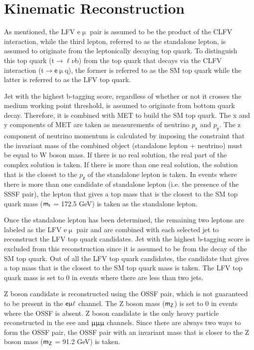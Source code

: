 \section{Kinematic Reconstruction}
\label{sec:Kin}

As mentioned, the LFV e$\upmu$ pair is assumed to be the product of the \ac{CLFV} interaction, while the third lepton, referred to as the standalone lepton, is assumed to originate from the leptonically decaying top quark. To distinguish this top quark (t$\rightarrow\ell\nu$b) from the top quark that decays via the \ac{CLFV} interaction (t$\rightarrow\textsf{e}\upmu$q), the former is referred to as the \ac{SM} top quark while the latter is referred to as the LFV top quark. 

Jet with the highest b-tagging score, regardless of whether or not it crosses the medium working point threshold, is assumed to originate from bottom quark decay. Therefore, it is combined with \ac{MET} to build the \ac{SM} top quark. The x and y components of \ac{MET} are taken as measurements of neutrino $p_{\textsf{x}}$ and $p_{\textsf{y}}$. The z component of neutrino momentum is calculated by imposing the constraint that the invariant mass of the combined object (standalone lepton + neutrino) must be equal to W boson mass. If there is no real solution, the real part of the complex solution is taken. If there is more than one real solution, the solution that is the closest to the $p_{\textsf{z}}$ of the standalone lepton is taken. In events where there is more than one candidate of standalone lepton (i.e. the presence of the \ac{SSSF} pair), the lepton that gives a top mass that is the closest to the \ac{SM} top quark mass ($\textsf{m}_{\textsf{t}}$ = 172.5 GeV) is taken as the standalone lepton.

Once the standalone lepton has been determined, the remaining two leptons are labeled as the LFV e$\upmu$ pair and are combined with each selected jet to reconstruct the LFV top quark candidates. Jet with the highest b-tagging score is excluded from this reconstruction since it is assumed to be from the decay of the \ac{SM} top quark. Out of all the LFV top quark candidates, the candidate that gives a top mass that is the closest to the \ac{SM} top quark mass is taken. The LFV top quark mass is set to 0 in events where there are less than two jets.

Z boson candidate is reconstructed using the \ac{OSSF} pair, which is not guaranteed to be present in the $\textsf{e}\upmu\ell$ channel. The Z boson mass ($\textsf{m}_{\textsf{Z}}$) is set to 0 in events where the \ac{OSSF} is absent. Z boson candidate is the only heavy particle reconstructed in the eee and $\upmu\upmu\upmu$ channels. Since there are always two ways to form the \ac{OSSF} pair, the \ac{OSSF} pair with an invariant mass that is closer to the Z boson mass ($\textsf{m}_{\textsf{Z}}$ = 91.2 GeV) is taken. 


